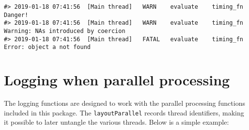 \documentclass[]{article}
\newenvironment{Shaded}{\begin{snugshade}}{\end{snugshade}}
\newcommand{\CommentTok}[1]{\textcolor[rgb]{0.56,0.35,0.01}{\textit{#1}}}
\newcommand{\ControlFlowTok}[1]{\textcolor[rgb]{0.13,0.29,0.53}{\textbf{#1}}}
\newcommand{\DataTypeTok}[1]{\textcolor[rgb]{0.13,0.29,0.53}{#1}}
\newcommand{\DecValTok}[1]{\textcolor[rgb]{0.00,0.00,0.81}{#1}}
\newcommand{\KeywordTok}[1]{\textcolor[rgb]{0.13,0.29,0.53}{\textbf{#1}}}
\newcommand{\NormalTok}[1]{#1}
\newcommand{\OperatorTok}[1]{\textcolor[rgb]{0.81,0.36,0.00}{\textbf{#1}}}
\newcommand{\OtherTok}[1]{\textcolor[rgb]{0.56,0.35,0.01}{#1}}
\newcommand{\StringTok}[1]{\textcolor[rgb]{0.31,0.60,0.02}{#1}}
\begin{document}
\begin{verbatim}
#> 2019-01-18 07:41:56  [Main thread]   WARN    evaluate    timing_fn   Danger!
#> 2019-01-18 07:41:56  [Main thread]   WARN    evaluate    timing_fn   Warning: NAs introduced by coercion
#> 2019-01-18 07:41:56  [Main thread]   FATAL   evaluate    timing_fn   Error: object a not found
\end{verbatim}

\hypertarget{logging-when-parallel-processing}{%
\section{Logging when parallel
processing}\label{logging-when-parallel-processing}}

The logging functions are designed to work with the parallel processing
functions included in this package. The \texttt{layoutParallel} records
thread identifiers, making it possible to later untangle the various
threads. Below is a simple example:

\begin{Shaded}
\end{Shaded}
\end{document}
